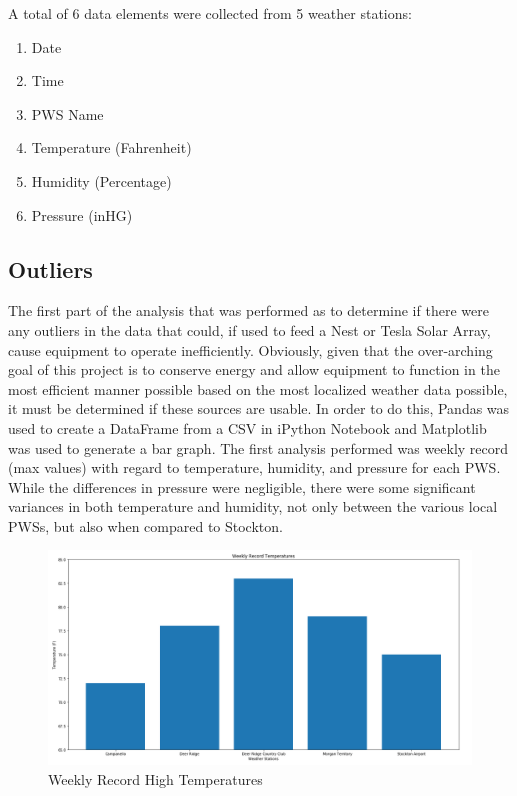 \documentclass[sigconf]{acmart}
\begin{document}
A total of 6 data elements were collected from 5 weather stations:

\begin{enumerate}
    \item Date
    \item Time
    \item PWS Name
    \item Temperature (Fahrenheit)
    \item Humidity (Percentage)
    \item Pressure (inHG)
\end{enumerate}

\subsection{Outliers}

The first part of the analysis that was performed as to determine if there were any outliers in the data that could, if used to feed a Nest or Tesla Solar Array, cause equipment to operate inefficiently. Obviously, given that the over-arching goal of this project is to conserve energy and allow equipment to function in the most efficient manner possible based on the most localized weather data possible, it must be determined if these sources are usable. In order to do this, Pandas was used to create a DataFrame from a CSV in iPython Notebook and Matplotlib was used to generate a bar graph. The first analysis performed was weekly record (max values) with regard to temperature, humidity, and pressure for each PWS. While the differences in pressure were negligible, there were some significant variances in both temperature and humidity, not only between the various local PWSs, but also when compared to Stockton. 

\begin{figure}[H]
    \centering
    \includegraphics[width=\columnwidth]{images/WK_REC_TEMP.PNG}
    \caption{Weekly Record High Temperatures}
\end{figure}
\end{document}
